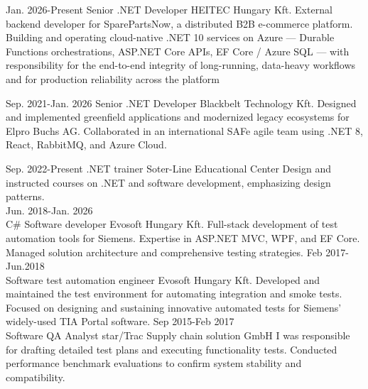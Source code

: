 \documentclass[9pt]{developercv}
\begin{document}
\begin{entrylist}
	
    \entry
    {Jan. 2026-Present}
    {Senior .NET Developer}
    {HEITEC Hungary Kft.}
    {External backend developer for SparePartsNow, a distributed B2B e-commerce platform.
    Building and operating cloud-native .NET 10 services on Azure — Durable Functions 
    orchestrations, ASP.NET Core APIs, EF Core / Azure SQL — with responsibility for the                                       
    end-to-end integrity of long-running, data-heavy workflows and for production reliability                                                       across the platform}

	\entry
    {Sep. 2021-Jan. 2026}
    {Senior .NET Developer}
    {Blackbelt Technology Kft.}
    {Designed and implemented greenfield applications and modernized legacy ecosystems for Elpro Buchs AG. Collaborated in an international SAFe agile team using .NET 8, React, RabbitMQ, and Azure Cloud.}

	\entry
		{Sep. 2022-Present}
		{.NET trainer}
		{Soter-Line Educational Center}
		{{Design and instructed courses on .NET and software development, emphasizing design patterns. } \\ }
	\entry
		{Jun. 2018-Jan. 2026\\}
		{C\# Software developer}
		{Evosoft Hungary Kft.}
		{Full-stack development of test automation tools for Siemens. Expertise in ASP.NET MVC, WPF, and EF Core. Managed solution architecture and comprehensive testing strategies.}
	\entry
		{Feb 2017-Jun.2018\\}
		{Software test automation engineer}
		{Evosoft Hungary Kft.}
		{Developed and maintained the test environment for automating integration and smoke tests. Focused on designing and sustaining innovative automated tests for Siemens' widely-used TIA Portal software.}
	\entry
		{Sep 2015-Feb 2017\\}
		{Software QA Analyst}
		{star/Trac Supply chain solution GmbH}
		{I was responsible for drafting detailed test plans and executing functionality tests. Conducted performance benchmark evaluations to confirm system stability and compatibility.}
		
\end{entrylist}

\pagebreak
{}
\end{document}
